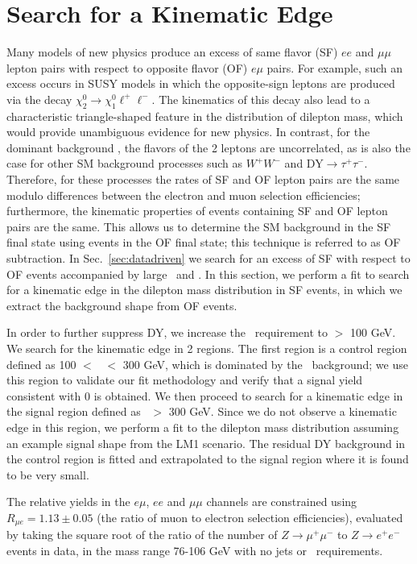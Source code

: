 \section{Search for a Kinematic Edge}
\label{sec:fit}

Many models of new physics produce an excess of same flavor (SF) $ee$ and $\mu\mu$ lepton pairs
with respect to opposite flavor (OF) $e\mu$ pairs. For example, such an excess occurs in SUSY models
in which the opposite-sign leptons are produced via the decay $\chi_2^0 \to \chi_1^0 \ell^+\ell^-$.
The kinematics of this decay also lead to a characteristic triangle-shaped feature in the distribution
of dilepton mass, which would provide unambiguous evidence for new physics.
In contrast, for the dominant background \ttbar, the flavors of the 2 leptons are uncorrelated,
as is also the case for other SM background processes such as $W^+W^-$ and DY$\to\tau^+\tau^-$.
Therefore, for these processes the rates of SF and OF lepton pairs are the same modulo differences
between the electron and muon selection efficiencies; 
furthermore, the kinematic properties of events containing SF and OF lepton pairs are the same. 
This allows us to determine the SM background in the SF final state using events in the OF
final state; this technique is referred to as OF subtraction. In Sec.~\ref{sec:datadriven}
we search for an excess of SF with respect to OF events accompanied by large \MET\ and \Ht. 
In this section, we perform a fit to search for a kinematic edge in the dilepton mass distribution 
in SF events, in which we extract the background shape from OF events.

In order to further suppress DY, we increase the \MET\ requirement to \MET $>$ 100 GeV. 
We search for the kinematic edge in 2 regions.  The first region is a control region defined
as 100 $<$ \Ht\ $<$ 300 GeV, which is dominated by the \ttbar\ background; we use 
this region to validate our fit methodology and verify that a signal yield consistent with 0 
is obtained. We then proceed to search for a kinematic edge in the signal region defined as 
\Ht\ $>$ 300 GeV. Since we do not observe a kinematic edge in this region, we perform a 
fit to the dilepton mass distribution assuming an example signal shape from the LM1 scenario.
The residual DY background in the control region is fitted and extrapolated
to the signal region where it is found to be very small.

The relative yields in the $e\mu$, $ee$ and $\mu\mu$ channels are constrained
using $R_{\mu e} = 1.13 \pm 0.05$ (the ratio of muon to electron selection efficiencies),
evaluated by taking the square root of the ratio of the number of 
$Z \to \mu^+\mu^-$ to $Z \to e^+e^-$ events in data, in the mass range 76-106 GeV with no jets or 
\met\ requirements. 
 
